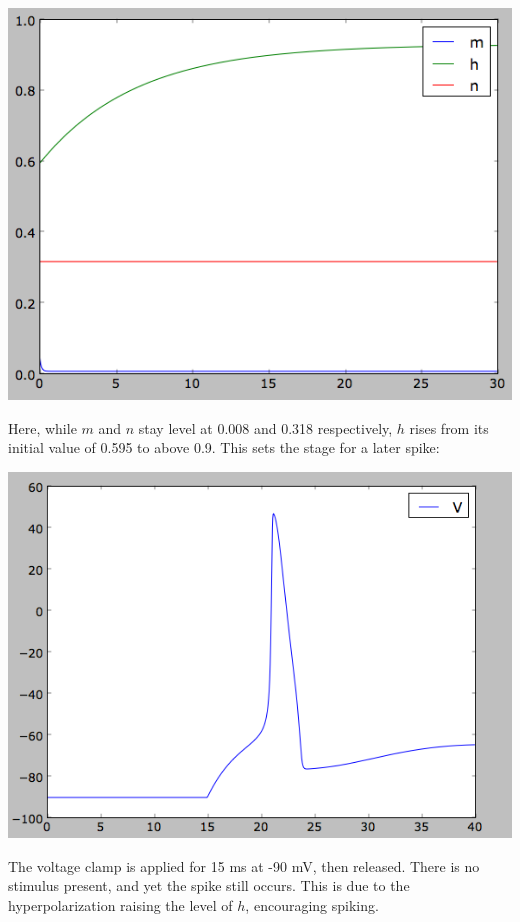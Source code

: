 \documentclass[12pt]{article}
\begin{document}
\vspace{10pt}
\includegraphics[scale=0.59]{risingh.png}
\vspace{10pt}

Here, while $m$ and $n$ stay level at 0.008 and 0.318 respectively, $h$ rises from its initial value of 0.595 to above 0.9.  This sets the stage for a later spike:

\vspace{10pt}
\includegraphics[scale=0.54]{hyperspike.png}
\vspace{10pt}

The voltage clamp is applied for 15 ms at -90 mV, then released.  There is no stimulus present, and yet the spike still occurs.  This is due to the hyperpolarization raising the level of $h$, encouraging spiking.
\end{document}
